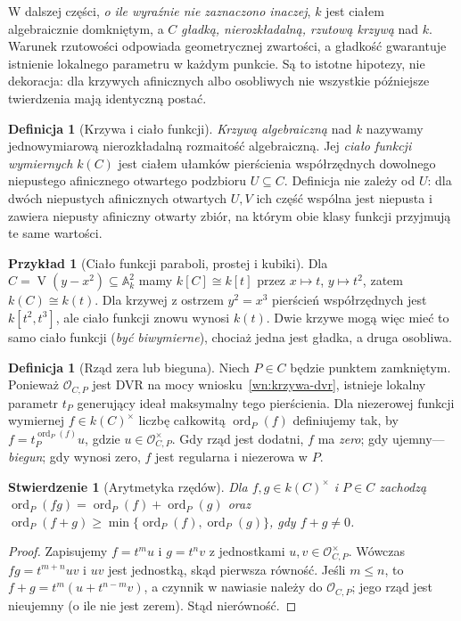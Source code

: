 \documentclass[11pt,a4paper,openany]{report}
\numberwithin{equation}{section}
\theoremstyle{plain}
\newtheorem{stwierdzenie}[twierdzenie]{Stwierdzenie}
\theoremstyle{definition}
\newtheorem{definicja}[twierdzenie]{Definicja}
\newtheorem{przyklad}[twierdzenie]{Przykład}
\theoremstyle{remark}
\newcommand{\A}{\mathbb A}
\newcommand{\V}{\operatorname V}
\begin{document}
W dalszej części, \emph{o ile wyraźnie nie zaznaczono
inaczej}, $k$ jest ciałem algebraicznie domkniętym,
a $C$ \emph{gładką, nierozkładalną, rzutową krzywą}
nad $k$. Warunek rzutowości odpowiada geometrycznej
zwartości, a gładkość gwarantuje istnienie lokalnego
parametru w każdym punkcie. Są to istotne hipotezy,
nie dekoracja: dla krzywych afinicznych albo osobliwych
nie wszystkie późniejsze twierdzenia mają identyczną postać.

\begin{definicja}[Krzywa i ciało funkcji]
\emph{Krzywą algebraiczną} nad $k$ nazywamy
jednowymiarową nierozkładalną rozmaitość algebraiczną.
Jej \emph{ciało funkcji wymiernych} $k(C)$ jest
ciałem ułamków pierścienia współrzędnych dowolnego
niepustego afinicznego otwartego podzbioru $U\subseteq C$.
Definicja nie zależy od $U$: dla dwóch niepustych
afinicznych otwartych $U,V$ ich część wspólna jest
niepusta i zawiera niepusty afiniczny otwarty zbiór,
na którym obie klasy funkcji przyjmują te same wartości.
\end{definicja}

\begin{przyklad}[Ciało funkcji paraboli, prostej i kubiki]
Dla $C=\V(y-x^2)\subseteq\A^2_k$ mamy
$k[C]\cong k[t]$ przez $x\mapsto t$, $y\mapsto t^2$,
zatem $k(C)\cong k(t)$. Dla krzywej z ostrzem
$y^2=x^3$ pierścień współrzędnych jest
$k[t^2,t^3]$, ale ciało funkcji znowu wynosi $k(t)$.
Dwie krzywe mogą więc mieć to samo ciało funkcji
(\emph{być biwymierne}), chociaż jedna jest gładka,
a druga osobliwa.
\end{przyklad}

\begin{definicja}[Rząd zera lub bieguna]
\label{def:ord}
Niech $P\in C$ będzie punktem zamkniętym.
Ponieważ $\mathcal O_{C,P}$ jest DVR na mocy
wniosku~\ref{wn:krzywa-dvr}, istnieje lokalny parametr
$t_P$ generujący ideał maksymalny tego pierścienia.
Dla niezerowej funkcji wymiernej $f\in k(C)^\times$
liczbę całkowitą $\operatorname{ord}_P(f)$ definiujemy
tak, by $f=t_P^{\operatorname{ord}_P(f)}u$,
gdzie $u\in\mathcal O_{C,P}^\times$.
Gdy rząd jest dodatni, $f$ ma \emph{zero}; gdy
ujemny---\emph{biegun}; gdy wynosi zero, $f$
jest regularna i niezerowa w $P$.
\end{definicja}

\begin{stwierdzenie}[Arytmetyka rzędów]
Dla $f,g\in k(C)^\times$ i $P\in C$ zachodzą
$\operatorname{ord}_P(fg)=\operatorname{ord}_P(f)+
\operatorname{ord}_P(g)$ oraz
$\operatorname{ord}_P(f+g)\ge\min
\{\operatorname{ord}_P(f),\operatorname{ord}_P(g)\}$,
gdy $f+g\ne0$.
\end{stwierdzenie}
\begin{proof}
Zapisujemy $f=t^m u$ i $g=t^n v$ z jednostkami
$u,v\in\mathcal O_{C,P}^\times$. Wówczas
$fg=t^{m+n}uv$ i $uv$ jest jednostką, skąd
pierwsza równość. Jeśli $m\le n$, to
$f+g=t^m(u+t^{n-m}v)$, a czynnik w nawiasie
należy do $\mathcal O_{C,P}$; jego rząd jest
nieujemny (o ile nie jest zerem). Stąd nierówność.
\end{proof}
\end{document}
